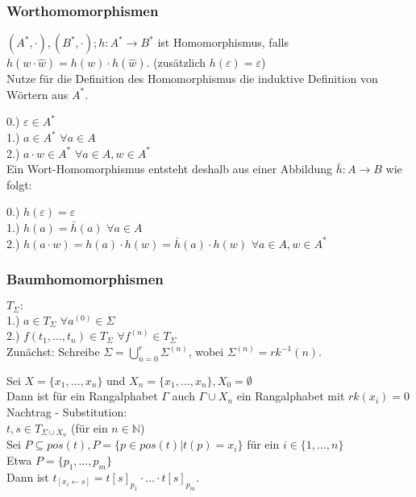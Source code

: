 \documentclass[titlepage]{article}
\begin{document}
\subsubsection{Worthomomorphismen}

$(A^\ast, \cdot), (B^\ast, \cdot); h: A^\ast \to B^\ast$ ist Homomorphismus, falls
$h(w \cdot \hat{w}) = h(w) \cdot h(\hat{w})$.
(zus\"atzlich $h(\varepsilon) = \varepsilon$)\\

Nutze f\"ur die Definition des Homomorphismus die induktive Definition von W\"ortern aus 
$A^\ast$.

0.) $\varepsilon \in A^\ast$\\
1.) $a \in A^\ast$ $\forall a \in A$\\
2.) $a \cdot w \in A^\ast$ $\forall a \in A, w \in A^\ast$\\

Ein Wort-Homomorphismus entsteht deshalb aus einer Abbildung $\bar{h}: A \to B$
wie folgt:

0.) $h(\varepsilon) = \varepsilon$\\
1.) $h(a) = \bar{h}(a)$ $\forall a \in A$\\
2.) $h(a \cdot w) = h(a) \cdot h(w) = \bar{h}(a) \cdot h(w)$ $\forall a \in A, w \in A^\ast$\\

\subsubsection{Baumhomomorphismen}

$T_\Sigma:$\\
1.) $a \in T_\Sigma$ $\forall a^{(0)} \in \Sigma$\\
2.) $f(t_1, \dots, t_n) \in T_\Sigma$ $\forall f^{(n)} \in T_\Sigma$\\

Zun\"achst: Schreibe $\Sigma = \bigcup\limits_{n=0}^{r} \Sigma^{(n)}$, wobei
$\Sigma^{(n)} = rk^{-1}(n)$.

Sei $X = \{x_1, \dots, x_n\}$ und $X_n = \{x_1, \dots, x_n\}, X_0 = \emptyset$\\

Dann ist f\"ur ein Rangalphabet $\Gamma$ auch $\Gamma \cup X_n$ ein Rangalphabet mit 
$rk(x_i) = 0$\\

Nachtrag - Substitution:\\
$t, s \in T_{\Sigma \cup X_n}$ (f\"ur ein $n \in \mathbb{N}$)\\
Sei $P \subseteq pos(t), P = \{ p \in pos(t) | t(p) = x_i\}$ f\"ur ein $i \in \{1, \dots, n\}$\\
Etwa $P = \{p_1, \dots, p_m\}$\\
Dann ist $t_{[x_i \leftarrow s]} = t[s]_{p_1} \cdot \dots \cdot t[s]_{p_m}$.\\
\end{document}
